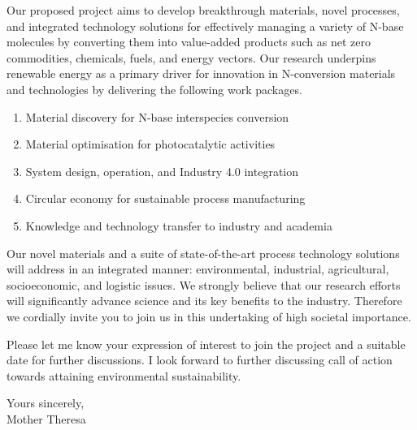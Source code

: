 \documentclass{amm-pst-letter}
\begin{document}
Our proposed project aims to develop breakthrough materials, novel
processes, and integrated technology solutions for effectively
managing a variety of N-base molecules by converting them into
value-added products such as net zero commodities, chemicals, fuels,
and energy vectors. Our research underpins renewable energy as a
primary driver for innovation in N-conversion materials and
technologies by delivering the following work packages.

\begin{enumerate}
\item Material discovery for N-base interspecies conversion
\item Material optimisation for photocatalytic activities
\item System design, operation, and Industry 4.0 integration
\item Circular economy for sustainable process manufacturing
\item Knowledge and technology transfer to industry and academia
\end{enumerate}

Our novel materials and a suite of state-of-the-art process
technology solutions will address in an integrated manner:
environmental, industrial, agricultural, socioeconomic, and logistic
issues. We strongly believe that our research efforts will
significantly advance science and its key benefits to the industry.
Therefore we cordially invite you to join us in this undertaking of
high societal importance.

Please let me know your expression of interest to join the project and a suitable date for further discussions. I look forward to further discussing call of action towards attaining environmental sustainability.

\par
\bigskip
Yours sincerely,\\[2mm]
Mother Theresa
\end{document}
